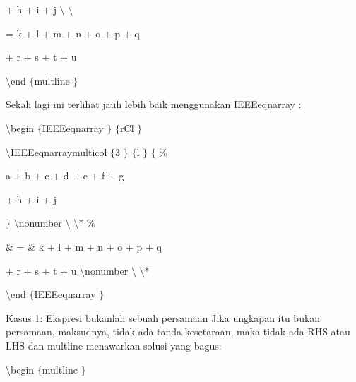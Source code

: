 \noindent 
+ h + i + j  $  \setminus  $ $  \setminus  $ \par
\vspace{12pt}
\noindent 
= k + l + m + n + o + p + q \par
\vspace{12pt}
\noindent 
+ r + s + t + u \par
\vspace{12pt}
\noindent 
 $  \setminus  $end $  \{  $multline $  \}  $ \par
\noindent 
\vspace{16pt}
\noindent 
Sekali lagi ini terlihat jauh lebih baik menggunakan IEEEeqnarray : \par
\vspace{12pt}
\noindent 
 $  \setminus  $begin $  \{  $IEEEeqnarray $  \}  $ $  \{  $rCl $  \}  $ \par
\vspace{12pt}
\noindent 
 $  \setminus  $IEEEeqnarraymulticol $  \{  $3 $  \}  $ $  \{  $l $  \}  $ $  \{  $ $  \%  $ \par
\vspace{12pt}
\noindent 
a + b + c + d + e + f + g \par
\vspace{12pt}
\noindent 
+ h + i + j \par
\vspace{12pt}
\noindent 
 $  \}  $ $  \setminus  $nonumber $  \setminus  $ $  \setminus  $* $  \%  $ \par
\vspace{12pt}
\noindent 
 $  \&  $ =  $  \&  $ k + l + m + n + o + p + q \par
\vspace{12pt}
\noindent 
+ r + s + t + u  $  \setminus  $nonumber $  \setminus  $ $  \setminus  $* \par
\vspace{12pt}
\noindent 
 $  \setminus  $end $  \{  $IEEEeqnarray $  \}  $ \par
\vspace{12pt}
\vspace{12pt}
\noindent 
Kasus 1: Ekspresi bukanlah sebuah persamaan Jika ungkapan itu bukan persamaan, maksudnya, tidak ada tanda kesetaraan, maka tidak ada RHS atau LHS dan multline menawarkan solusi yang bagus: \par
\vspace{12pt}
\noindent 
 $  \setminus  $begin $  \{  $multline $  \}  $ \par
\vspace{12pt}
